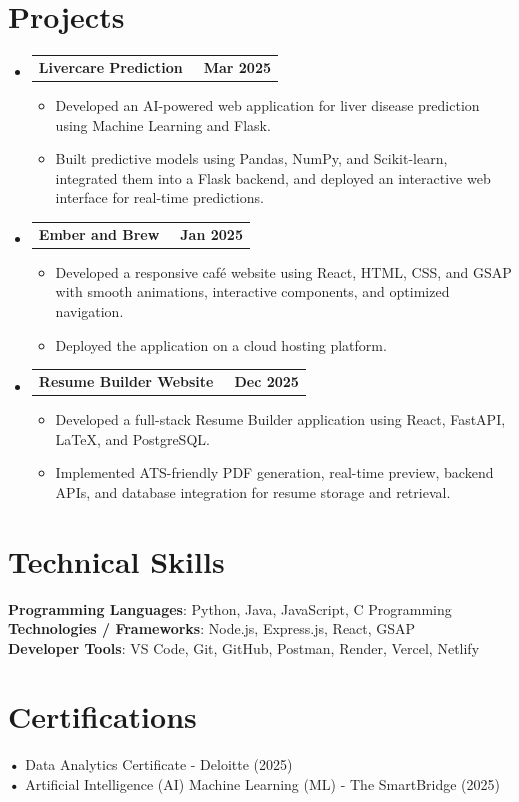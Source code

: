 \documentclass[letterpaper,11pt]{article}
\makeatletter
\newcommand{\resumeItem}[1]{
  \item\small{#1}
}
\newcommand{\resumeSubHeadingListStart}{\begin{itemize}[label={}]}
\newcommand{\resumeSubHeadingListEnd}{\end{itemize}}
\newcommand{\resumeItemListStart}{\begin{itemize}}
\newcommand{\resumeItemListEnd}{\end{itemize}}
\newcommand{\resumeProjectHeading}[2]{
  \item
  \begin{tabular*}{\textwidth}{l@{\extracolsep{\fill}}r}
    #1 & \textbf{#2} \\
  \end{tabular*}
}
\makeatother
\begin{document}
\section{Projects}
\resumeSubHeadingListStart
\resumeProjectHeading{\textbf{Livercare Prediction}~\href{https://github.com/Omkarpawar1880/Livercirhosis}{\faExternalLink*}}{Mar 2025}
\resumeItemListStart
\resumeItem{Developed an AI-powered web application for liver disease prediction using Machine Learning and Flask.}
\resumeItem{Built predictive models using Pandas, NumPy, and Scikit-learn, integrated them into a Flask backend, and deployed an interactive web interface for real-time predictions.}
\resumeItemListEnd
\resumeProjectHeading{\textbf{Ember and Brew}~\href{https://github.com/Omkarpawar1880/Coffe1880}{\faExternalLink*}}{Jan 2025}
\resumeItemListStart
\resumeItem{Developed a responsive café website using React, HTML, CSS, and GSAP with smooth animations, interactive components, and optimized navigation.}
\resumeItem{Deployed the application on a cloud hosting platform.}
\resumeItemListEnd
\resumeProjectHeading{\textbf{Resume Builder Website}~\href{https://github.com/Omkarpawar1880/Resume}{\faExternalLink*}}{Dec 2025}
\resumeItemListStart
\resumeItem{Developed a full-stack Resume Builder application using React, FastAPI, LaTeX, and PostgreSQL.}
\resumeItem{Implemented ATS-friendly PDF generation, real-time preview, backend APIs, and database integration for resume storage and retrieval.}
\resumeItemListEnd

\resumeSubHeadingListEnd

\section{Technical Skills}
\resumeSubHeadingListStart
\small{\item{
\textbf{Programming Languages}: Python, Java, JavaScript, C Programming \\
\textbf{Technologies / Frameworks}: Node.js, Express.js, React, GSAP \\
\textbf{Developer Tools}: VS Code, Git, GitHub, Postman, Render, Vercel, Netlify \\
}}

\resumeSubHeadingListEnd

\section{Certifications}
\resumeSubHeadingListStart
\small{\item{
\textbf{•} Data Analytics Certificate - Deloitte (2025) \\
\textbf{•} Artificial Intelligence (AI) Machine Learning (ML) - The SmartBridge (2025) \\
}}

\resumeSubHeadingListEnd
\end{document}
